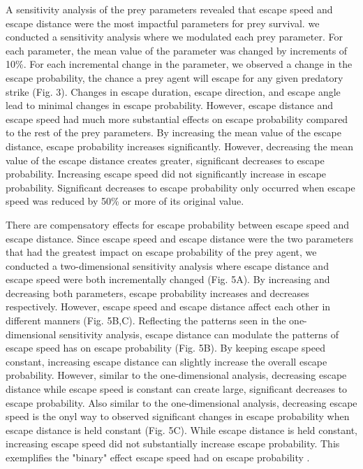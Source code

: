 \documentclass[]{rsos}%
\begin{document}
A sensitivity analysis of the prey parameters revealed that escape speed and escape distance were the most impactful parameters for prey survival. we conducted a sensitivity analysis where we modulated each prey parameter. For each parameter, the mean value of the parameter was changed by increments of 10\%. For each incremental change in the parameter, we observed a change in the escape probability, the chance a prey agent will escape for any given predatory strike (Fig. 3). Changes in escape duration, escape direction, and escape angle lead to minimal changes in escape probability. However, escape distance and escape speed had much more substantial effects on escape probability compared to the rest of the prey parameters. By increasing the mean value of the escape distance, escape probability increases significantly. However, decreasing the mean value of the escape distance creates greater, significant decreases to escape probability. Increasing escape speed did not significantly increase in escape probability. Significant decreases to escape probability only occurred when escape speed was reduced by 50\% or more of its original value.

There are compensatory effects for escape probability between escape speed and escape distance. Since escape speed and escape distance were the two parameters that had the greatest impact on escape probability of the prey agent, we conducted a two-dimensional sensitivity analysis where escape distance and escape speed were both incrementally changed (Fig. 5A). By increasing and decreasing both parameters, escape probability increases and decreases respectively. However, escape speed and escape distance affect each other in different manners (Fig. 5B,C). Reflecting the patterns seen in the one-dimensional sensitivity analysis, escape distance can modulate the patterns of escape speed has on escape probability (Fig. 5B). By keeping escape speed constant, increasing escape distance can slightly increase the overall escape probability. However, similar to the one-dimensional analysis, decreasing escape distance while escape speed is constant can create large, significant decreases to escape probability. Also similar to the one-dimensional analysis, decreasing escape speed is the onyl way to observed significant changes in escape probability when escape distance is held constant (Fig. 5C).  While escape distance is held constant, increasing escape speed did not substantially increase escape probability. This exemplifies the "binary" effect escape speed had on escape probability .
\end{document}
